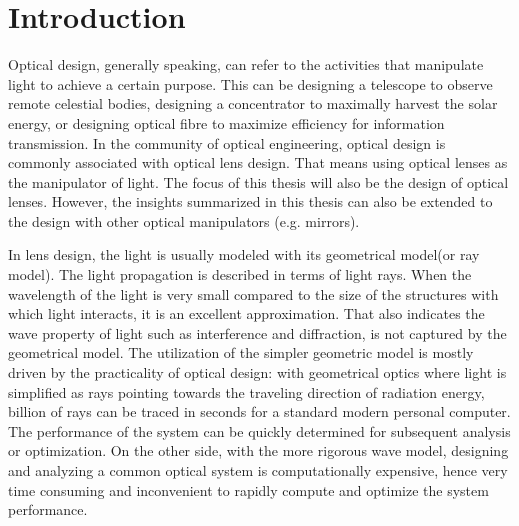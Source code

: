 \chapter{Introduction}
\label{chapter_1_intro}
\graphicspath{ {./chapter-sp/figures/} }
\captionsetup[figure]{labelfont=bf}
\captionsetup{margin=1.5em}
\captionsetup[table]{labelfont=bf}


Optical design, generally speaking, can refer to the activities that manipulate light to achieve a certain purpose. This can be designing a telescope to observe remote celestial bodies, designing a concentrator to maximally harvest the solar energy, or designing optical fibre to maximize efficiency for information transmission. In the community of optical engineering, optical design is commonly associated with optical lens design. That means using optical lenses as the manipulator of light. The focus of this thesis will also be the design of optical lenses. However, the insights summarized in this thesis can also be extended to the design with other optical manipulators (e.g. mirrors).

In lens design, the light is usually modeled with its geometrical model(or ray model). The light propagation is described in terms of light rays. When the wavelength of the light is very small compared to the size of the structures with which light interacts, it is an excellent approximation. That also indicates the wave property of light such as interference and diffraction, is not captured by the geometrical model. The utilization of the simpler geometric model is mostly driven by the practicality of optical design: with geometrical optics where light is simplified as rays pointing towards the traveling direction of radiation energy, billion of rays can be traced in seconds for a standard modern personal computer. The performance of the system can be quickly determined for subsequent analysis or optimization. On the other side, with the more rigorous wave model, designing and analyzing a common optical system is computationally expensive, hence very time consuming and inconvenient to rapidly compute and optimize the system performance. 


